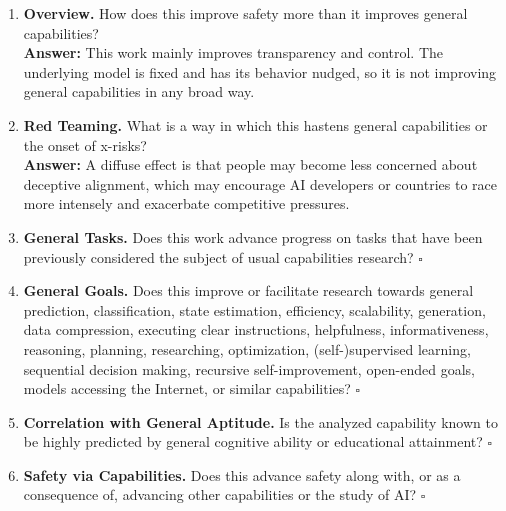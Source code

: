 \begin{enumerate}[resume]
\item \textbf{Overview.} How does this improve safety more than it improves general capabilities? \\
\textbf{Answer:} This work mainly improves transparency and control. The underlying model is fixed and has its behavior nudged, so it is not improving general capabilities in any broad way.


\item \textbf{Red Teaming.} What is a way in which this hastens general capabilities or the onset of x-risks? \\
\textbf{Answer:} A diffuse effect is that people may become less concerned about deceptive alignment, which may encourage AI developers or countries to race more intensely and exacerbate competitive pressures.

\item \textbf{General Tasks.} Does this work advance progress on tasks that have been previously considered the subject of usual capabilities research? \hfill $\square$

\item \textbf{General Goals.} Does this improve or facilitate research towards general prediction, classification, state estimation, efficiency, scalability, generation, data compression, executing clear instructions, helpfulness, informativeness, reasoning, planning, researching, optimization, (self-)supervised learning, sequential decision making, recursive self-improvement, open-ended goals, models accessing the
Internet, or similar capabilities? \hfill $\square$

\item \textbf{Correlation with General Aptitude.} Is the analyzed capability known to be highly predicted by general cognitive ability or educational attainment? \hfill $\square$

\item \textbf{Safety via Capabilities.} Does this advance safety along with, or as a consequence of, advancing other capabilities or the study of AI? \hfill $\square$
\end{enumerate}

